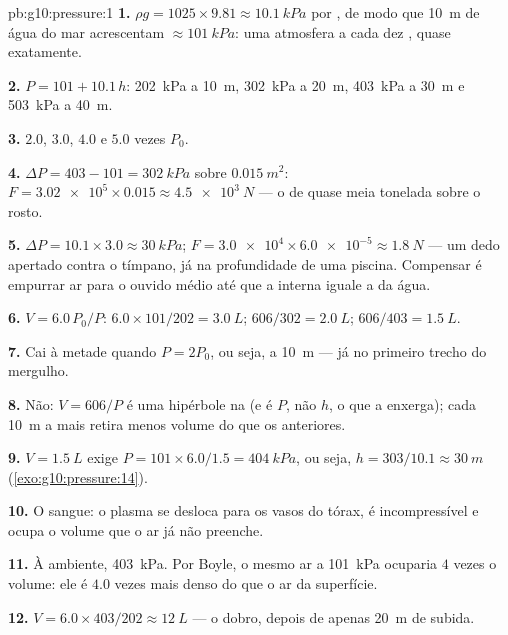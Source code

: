 \begin{solution}{pb:g10:pressure:1}
\textbf{1.} $\rho g = 1025 \times 9.81 \approx \qty{10.1}{kPa}$ por
, de modo que \qty{10}{m} de água do mar acrescentam
$\approx \qty{101}{kPa}$: uma atmosfera a cada dez , quase
exatamente.

\textbf{2.} $P = 101 + 10.1\,h$: \qty{202}{kPa} a \qty{10}{m},
\qty{302}{kPa} a \qty{20}{m}, \qty{403}{kPa} a \qty{30}{m} e
\qty{503}{kPa} a \qty{40}{m}.

\textbf{3.} $2.0$, $3.0$, $4.0$ e $5.0$ vezes $P_0$.

\textbf{4.} $\Delta P = 403 - 101 = \qty{302}{kPa}$ sobre
$\qty{0.015}{m^2}$:
$F = \num{3.02e5} \times 0.015 \approx \qty{4.5e3}{N}$ --- o  de
quase meia tonelada sobre o rosto.

\textbf{5.} $\Delta P = 10.1 \times 3.0 \approx \qty{30}{kPa}$;
$F = \num{3.0e4} \times \num{6.0e-5} \approx \qty{1.8}{N}$ --- um dedo
apertado contra o tímpano, já na profundidade de uma piscina. Compensar é
empurrar ar para o ouvido médio até que a  interna iguale a da
água.

\textbf{6.} $V = 6.0 \, P_0/P$: $6.0 \times 101/202 = \qty{3.0}{L}$;
$606/302 = \qty{2.0}{L}$; $606/403 = \qty{1.5}{L}$.

\textbf{7.} Cai à metade quando $P = 2P_0$, ou seja, a \qty{10}{m} --- já
no primeiro trecho do mergulho.

\textbf{8.} Não: $V = 606/P$ é uma hipérbole na  (e é
$P$, não $h$, o que a  enxerga); cada \qty{10}{m} a mais
retira menos volume do que os anteriores.

\textbf{9.} $V = \qty{1.5}{L}$ exige
$P = 101 \times 6.0/1.5 = \qty{404}{kPa}$, ou seja,
$h = 303/10.1 \approx \qty{30}{m}$ (\cref{exo:g10:pressure:14}).

\textbf{10.} O sangue: o plasma se desloca para os vasos do tórax, é
incompressível e ocupa o volume que o ar já não preenche.

\textbf{11.} À  ambiente, \qty{403}{kPa}. Por Boyle, o mesmo ar a
\qty{101}{kPa} ocuparia $4$ vezes o volume: ele é $4.0$ vezes mais denso
do que o ar da superfície.

\textbf{12.} $V = 6.0 \times 403/202 \approx \qty{12}{L}$ --- o dobro,
depois de apenas \qty{20}{m} de subida.


\end{solution}
